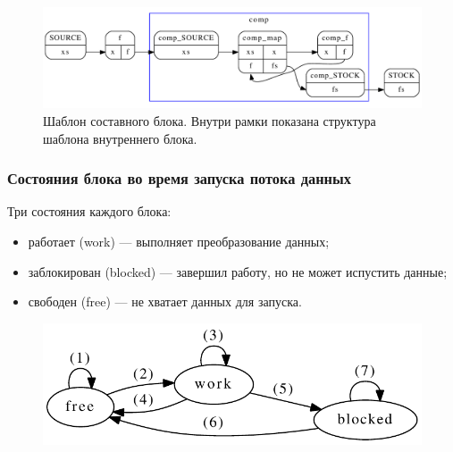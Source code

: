 \documentclass[10pt,pdf,hyperref={unicode}]{beamer}
\begin{document}
\begin{frame}
  \begin{figure}[H]
    \centering
    \includegraphics[width=\textwidth]{cc_cg.pdf}
    \caption{Шаблон составного блока. Внутри рамки показана структура шаблона внутреннего блока.}
    \label{example:supercomposite}
  \end{figure}
\end{frame}

\begin{frame}
  \frametitle{Состояния блока во время запуска потока данных}
  Три состояния каждого блока:
  \begin{itemize}
    \item работает (work) --- выполняет преобразование данных;
    \item заблокирован (blocked) --- завершил работу, но не может испустить данные;
    \item свободен (free) --- не хватает данных для запуска.
  \end{itemize}
  
  \begin{figure}[H]
    \centering
    \includegraphics[width=\textwidth]{rules.pdf}
  \end{figure}
\end{frame}
\end{document}
